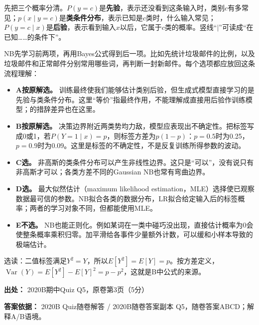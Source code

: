 先把三个概率分清。\(P(y=c)\)是\textbf{先验}，表示还没看到这条输入时，类别\(c\)有多常见；\(p(x\mid y=c)\)是\textbf{类条件分布}，表示已知是\(c\)类时，什么输入常见；\(P(y=c\mid x)\)是\textbf{后验}，表示看到输入\(x\)以后，它属于\(c\)类的概率。竖线“\(\mid\)”可读成“在已知……的条件下”。


NB先学习前两项，再用Bayes公式得到后一项。比如先统计垃圾邮件的比例，以及垃圾邮件和正常邮件分别常用哪些词，再判断一封新邮件。每个选项都应放回这条流程理解：



\begin{itemize}

\item \textbf{A按原解选。} 训练最终使我们能够估计类别后验，但生成式模型直接学习的是先验与类条件分布。这里“等价”指最终作用，不能理解成直接用后验作训练模型；的措辞差异也在这里。

\item \textbf{B按原解选。} 决策边界附近两类势均力敌，模型应表现出不确定性。把标签写成0或1，若\(P(Y=1\mid x)=p\)，则标签方差为\(p(1-p)\)：\(p=0.5\)时为0.25，\(p=0.9\)时为0.09。这里是标签的不确定性，不是反复训练所得参数的波动。

\item \textbf{C选。} 非高斯的类条件分布可以产生非线性边界。这只是“可以”，没有说只有非高斯才可以；各类方差不同的Gaussian NB也常有弯曲边界。

\item \textbf{D选。} 最大似然估计（maximum likelihood estimation，MLE）选择使已观察数据最可信的参数。NB拟合各类的数据分布，LR拟合给定输入后的标签概率；两者的学习对象不同，但都能使用MLE。

\item \textbf{E不选。} NB也能正则化。例如某词在一类中碰巧没出现，直接估计概率为0会使整条概率乘积归零。加平滑给各事件少量额外计数，可以缓和小样本导致的极端估计。

\end{itemize}


选读：二值标签满足\(Y^2=Y\)，所以\(E[Y^2]=E[Y]=p\)。按方差定义，\(\operatorname{Var}(Y)=E[Y^2]-E[Y]^2=p-p^2\)，这就是B中公式的来源。


\textbf{出处：} 2020B期中Quiz Q5，原卷第3页（5分）


\textbf{答案依据：} 2020B Quiz随卷解答 / 2020B随卷答案副本 Q5，随卷答案ABCD；解释A/B语境。
